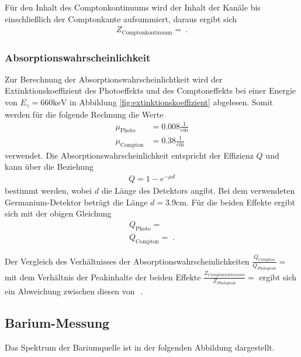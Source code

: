 Für den Inhalt des Comptonkontinuums wird der Inhalt der Kanäle bis einschließlich der Comptonkante aufsummiert, daraus ergibt sich
\begin{align}
    Z_{\text{Comptonkontinuum}} = \:.
\end{align}




\subsubsection{Absorptionswahrscheinlichkeit}
\label{sec:Absorptionswahrscheinlichkeit}
Zur Berechnung der Absorptionswahrscheinlichtkeit wird der Extinktionskoeffizient  des Photoeffekts und des Comptoneffekts bei einer Energie von $E_{\gamma} =660\text{keV}$ in Abbildung \ref{fig:extinktionskoeffizient} abgelesen. Somit werden für die folgende Rechnung die Werte
\begin{align}
  \mu_\textrm{Photo} &= 0.008\frac{\text{1}}{\text{cm}}\\
  \mu_\textrm{Compton} &=0.38\frac{\text{1}}{\text{cm}}
\end{align}
verwendet. Die Absorptionswahrscheinlichkeit entspricht der Effizienz $Q$ und kann über die Beziehung
\begin{align}
  Q=1-e^{-\mu d}
\end{align}
bestimmt werden, wobei $d$ die Länge des Detektors angibt. Bei dem verwendeten Germanium-Detektor beträgt die Länge $d=3.9\text{cm}$. Für die beiden Effekte ergibt sich mit der obigen Gleichung
\begin{align}
  Q_\textrm{Photo} = \\
  Q_\textrm{Compton} =  \; .
\end{align}

Der Vergleich des Verhältnisses der Absorptionswahrscheinlichkeiten  $\frac{Q_{Compton}}{Q_{Photopeak}}  = $ mit dem Verhältnis der Peakinhalte der beiden Effekte $\frac{Z_{Comptonkontinuum}}{Z_{Photopeak}} = $ ergibt sich ein Abweichung  zwischen diesen von $$ .

\subsection{Barium-Messung}
\label{sec:Barium_Messung}

Das Spektrum der Bariumquelle ist in der folgenden Abbildung dargestellt.

